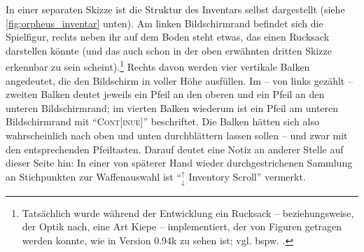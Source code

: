 \documentclass[a5paper,pagesize]{scrbook}
\begin{document}
In einer separaten Skizze ist die Struktur des Inventars selbst dargestellt (siehe \autoref{fig:orpheus_inventar} unten).
Am linken Bildschirmrand befindet sich die Spielfigur, rechts neben ihr auf dem Boden steht etwas, das einen Rucksack darstellen könnte (und das auch schon in der oben erwähnten dritten Skizze erkennbar zu sein scheint).\footnote{Tatsächlich wurde während der Entwicklung ein Rucksack -- beziehungsweise, der Optik nach, eine Art Kiepe -- implementiert, der von Figuren getragen werden konnte, wie in Version 0.94k zu sehen ist; vgl. bspw. \autocite{alpha_backpack_2023}.}
Rechts davon werden vier vertikale Balken angedeutet, die den Bildschirm in voller Höhe ausfüllen.
Im -- von links gezählt -- zweiten Balken deutet jeweils ein Pfeil an den oberen und ein Pfeil an den unteren Bildschirmrand; im vierten Balken wiederum ist ein Pfeil am unteren Bildschirmrand mit \enquote{\textsc{Cont[inue]}} beschriftet.
Die Balken hätten sich also wahrscheinlich nach oben und unten durchblättern lassen sollen -- und zwar mit den entsprechenden Pfeiltasten.
Darauf deutet eine Notiz an anderer Stelle auf dieser Seite hin:
In einer von späterer Hand wieder durchgestrichenen Sammlung an Stichpunkten zur Waffenauswahl ist \enquote{$_{\downarrow}^{\uparrow}$ Inventory Scroll} vermerkt. %
\end{document}
